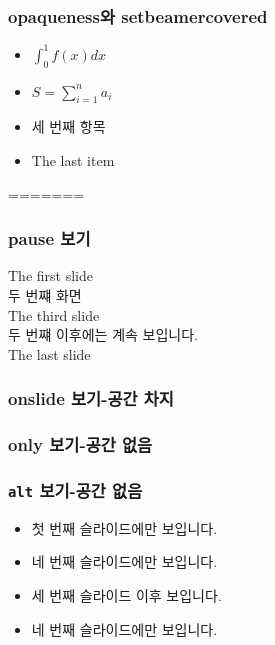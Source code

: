 \documentclass[xcolor=table]{beamer}
\begin{document}
\begin{frame}
\frametitle{opaqueness와 setbeamercovered}
\begin{itemize}
\item<1> $\int_0^1 f(x) dx$
\item<2> $S = \sum_{i=1}^n a_i$
\item<3> 세 번째 항목
\item<4> The last item
\end{itemize}
\end{frame}

=======
\begin{frame}
\frametitle{pause 보기}
The first slide \\
\pause
두 번쨰 화면 \\ 
\pause
The third slide \\
\pause[2]
두 번쨰 이후에는 계속 보입니다. \\
\pause
The last slide \\
\end{frame}

\begin{frame}
\frametitle{onslide 보기-공간 차지}
\end{frame}

\begin{frame}
\frametitle{only 보기-공간 없음}
\end{frame}

\begin{frame}
\frametitle{\texttt{alt} 보기-공간 없음}
\begin{itemize}
\item<1>{첫 번째 슬라이드에만 보입니다. \newline}
\item<2> 
{네 번째 슬라이드에만 보입니다. \newline}
\item<3->{세 번째 슬라이드 이후 보입니다. \newline}
\item<4>{네 번째 슬라이드에만 보입니다.}
\end{itemize}
\end{frame}
\end{document}

